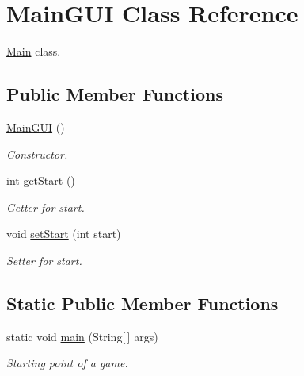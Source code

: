 \hypertarget{classMainGUI}{}\section{Main\+G\+UI Class Reference}
\label{classMainGUI}


\hyperlink{classMain}{Main} class.  


\subsection*{Public Member Functions}
\begin{DoxyCompactItemize}
\item 
\hyperlink{classMainGUI_a49c09db8105ae715258f1a29ac318c66}{Main\+G\+UI} ()
\begin{DoxyCompactList}\small\item\em Constructor. \end{DoxyCompactList}\item 
int \hyperlink{classMainGUI_a3d35950de747333a96fa0cca3c38eff5}{get\+Start} ()
\begin{DoxyCompactList}\small\item\em Getter for start. \end{DoxyCompactList}\item 
void \hyperlink{classMainGUI_abefcabebf411d9ae06fd1bd0c979ab59}{set\+Start} (int start)
\begin{DoxyCompactList}\small\item\em Setter for start. \end{DoxyCompactList}\end{DoxyCompactItemize}
\subsection*{Static Public Member Functions}
\begin{DoxyCompactItemize}
\item 
static void \hyperlink{classMainGUI_a8dd5b61b10beb51baab3664b296c4381}{main} (String\mbox{[}$\,$\mbox{]} args)\hypertarget{classMainGUI_a8dd5b61b10beb51baab3664b296c4381}{}\label{classMainGUI_a8dd5b61b10beb51baab3664b296c4381}

\begin{DoxyCompactList}\small\item\em Starting point of a game. \end{DoxyCompactList}\end{DoxyCompactItemize}
